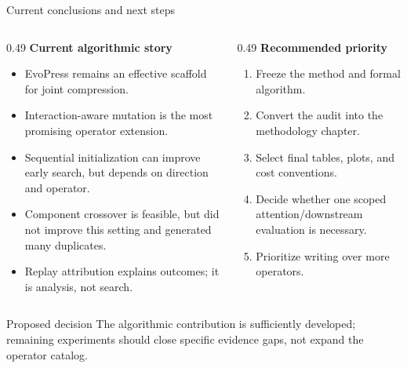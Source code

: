 \documentclass[aspectratio=169,10pt]{beamer}
\newcommand{\tightitems}{\setlength{\itemsep}{0.25em}\setlength{\parskip}{0pt}}
\begin{document}
\begin{frame}{Current conclusions and next steps}
\small
\begin{columns}[T,onlytextwidth]
\begin{column}{0.49\textwidth}
\textbf{Current algorithmic story}
\begin{itemize}\tightitems
  \item EvoPress remains an effective scaffold for joint compression.
  \item Interaction-aware mutation is the most promising operator extension.
  \item Sequential initialization can improve early search, but depends on direction and operator.
  \item Component crossover is feasible, but did not improve this setting and generated many duplicates.
  \item Replay attribution explains outcomes; it is analysis, not search.
\end{itemize}
\end{column}
\begin{column}{0.49\textwidth}
\textbf{Recommended priority}
\begin{enumerate}\tightitems
  \item Freeze the method and formal algorithm.
  \item Convert the audit into the methodology chapter.
  \item Select final tables, plots, and cost conventions.
  \item Decide whether one scoped attention/downstream evaluation is necessary.
  \item Prioritize writing over more operators.
\end{enumerate}
\end{column}
\end{columns}

\vspace{0.15cm}
\begin{alertblock}{Proposed decision}
The algorithmic contribution is sufficiently developed; remaining experiments should close specific evidence gaps, not expand the operator catalog.
\end{alertblock}
\end{frame}

\appendix
\end{document}
